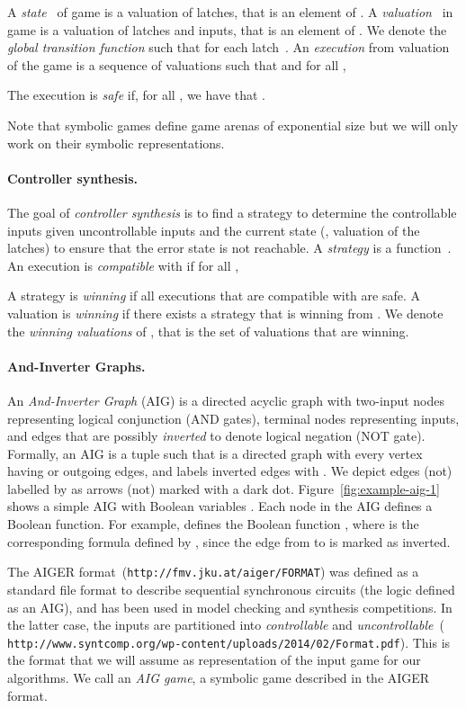 \documentclass[submission,copyright,creativecommons]{eptcs}
\begin{document}
A \emph{state}~ of game  is a valuation of latches, that is an element of
.  A \emph{valuation}~ in game  is a valuation of latches
and inputs, that is an element of .  We denote the
\emph{global transition function}  such that
 for each latch~. 
An \emph{execution} from valuation~ of the game  is a sequence of
valuations  such that  and for all ,

The execution is \emph{safe} if, for all , we have that .

Note that symbolic games define game arenas of exponential size but we will only
work on their symbolic representations.

\paragraph{Controller synthesis.}
The goal of \emph{controller synthesis} is to find a strategy to determine the
controllable inputs given uncontrollable inputs and the current state (\ie,
valuation of the latches) to ensure
that the error state is not reachable.  A \emph{strategy} is a
function~.  An execution
 is \emph{compatible} with  if for all , 

A strategy  is
\emph{winning} if all executions that are compatible with  are safe.  A
valuation  is \emph{winning} if there exists a strategy  that is winning
from .  We denote  the \emph{winning valuations} of , that is
the set of valuations that are winning.

\paragraph{And-Inverter Graphs.}
An \emph{And-Inverter Graph} (AIG) is a directed acyclic graph with two-input
nodes representing logical conjunction (AND gates), terminal nodes representing
inputs, and edges that are possibly \emph{inverted} to denote logical negation
(NOT gate). Formally, an AIG is a tuple  such that
 is a directed graph with every vertex having  or  outgoing edges,
and  labels inverted edges with . We depict edges
(not) labelled by  as arrows (not) marked with a dark dot.
Figure~\ref{fig:example-aig-1} shows a simple AIG with Boolean variables
. Each node in the AIG defines a Boolean function. For example,
 defines the Boolean function
, where
 is the corresponding formula defined by , since the edge from
 to  is marked as inverted.

The AIGER format~({\tt http://fmv.jku.at/aiger/FORMAT}) was defined as a standard
file format to describe sequential synchronous circuits (the logic defined as an
AIG), and has been used in model checking and synthesis competitions. In the
latter case, the inputs are partitioned into \emph{controllable} and
\emph{uncontrollable}~({\tt
http://www.syntcomp.org/wp-content/uploads/2014/02/Format.pdf}). This is the
format that we will assume as representation of the input game for our
algorithms.  We call an \emph{AIG game}, a symbolic game described in the AIGER
format.
\end{document}
